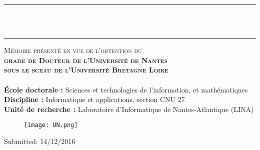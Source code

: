 \begin{titlepage}
\begin{center}
\vspace*{0.1cm}
\rule[9mm]{\textwidth}{2pt}\\
\noindent {\LARGE \textbf{\titre}}\\
\rule[-7mm]{\textwidth}{2pt}

\vspace*{2.3cm}
\noindent \large \textsc{Mémoire présenté en vue de l'obtention du \\{\bf grade de Docteur de l'Université de Nantes\\sous le sceau de l’Université Bretagne Loire}}\\
\vspace*{1.0cm}
\noindent \LARGE \ale{} \\\vspace*{3cm}
\noindent \large \textbf{École doctorale :} Sciences et technologies de l'information, et mathématiques\\
\textbf{Discipline :} Informatique et applications, section CNU 27\\
\textbf{Unité de recherche :} Laboratoire d'Informatique de Nantes-Atlantique (LINA)\\%
\vspace*{1cm}
\vfill
\vspace*{1cm}
\begin{figure}[!h]
\centering
\texttt{[image: UN.png]}
\caption*{}
\end{figure}

\vspace*{1.5cm}
\noindent \large {Submitted: 14/12/2016}


\end{center}
\end{titlepage}
